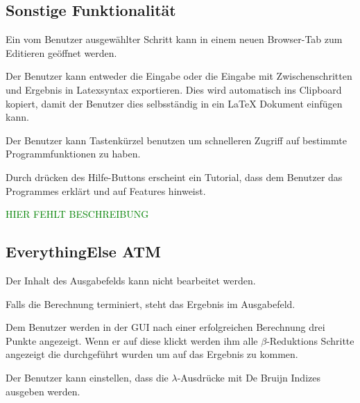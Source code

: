 \documentclass[parskip=full,11pt,twoside]{scrartcl}
\begin{document}
\subsection{Sonstige Funktionalität}

Ein vom Benutzer ausgewählter Schritt kann in einem neuen Browser-Tab zum Editieren geöffnet werden.

Der Benutzer kann entweder die Eingabe oder die Eingabe mit Zwischenschritten und Ergebnis in Latexsyntax exportieren. Dies wird automatisch ins Clipboard kopiert, damit der Benutzer dies selbsständig in ein LaTeX Dokument einfügen kann.

Der Benutzer kann Tastenkürzel benutzen um schnelleren Zugriff auf bestimmte Programmfunktionen zu haben.

Durch drücken des Hilfe-Buttons erscheint ein Tutorial, dass dem Benutzer das Programmes erklärt und auf Features hinweist.

\textcolor{green}{HIER FEHLT BESCHREIBUNG}









\subsection{EverythingElse ATM }

Der Inhalt des Ausgabefelds kann nicht bearbeitet werden.

Falls die Berechnung terminiert, steht das Ergebnis im Ausgabefeld.

Dem Benutzer werden in der GUI nach einer erfolgreichen Berechnung drei Punkte angezeigt. Wenn er auf diese klickt werden ihm alle $\beta$-Reduktions Schritte angezeigt die durchgeführt wurden um auf das Ergebnis zu kommen.

Der Benutzer kann einstellen, dass die $\lambda$-Ausdrücke mit De Bruijn Indizes ausgeben werden.
\end{document}
